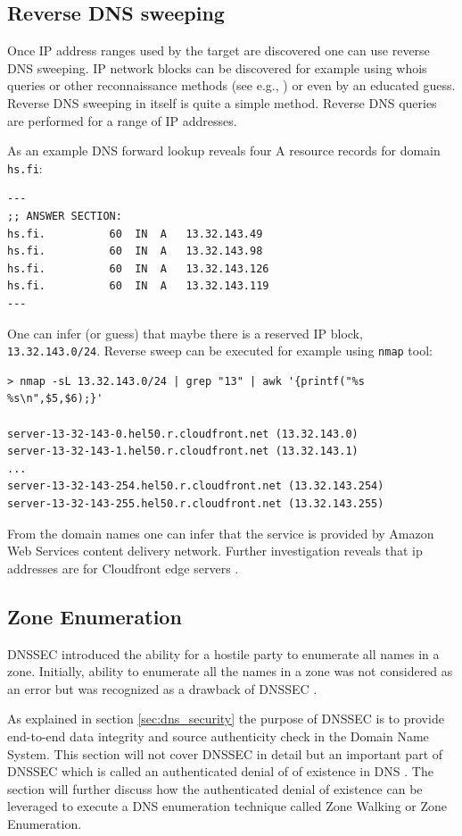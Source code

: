 \subsection{Reverse DNS sweeping}

Once IP address ranges used by the target are discovered one can use reverse DNS sweeping. IP network blocks can be discovered for example using whois queries or other reconnaissance methods (see e.g., \cite{network_sec_assessment}) or even by an educated guess. Reverse DNS sweeping in itself is quite a simple method. Reverse DNS queries are performed for a range of IP addresses. 

As an example DNS forward lookup reveals four A resource records for domain \texttt{hs.fi}:
\begin{verbatim}
---
;; ANSWER SECTION:
hs.fi.			60	IN	A	13.32.143.49
hs.fi.			60	IN	A	13.32.143.98
hs.fi.			60	IN	A	13.32.143.126
hs.fi.			60	IN	A	13.32.143.119
---
\end{verbatim}
One can infer (or guess) that maybe there is a reserved IP block, \texttt{13.32.143.0/24}. Reverse sweep can be executed for example using \texttt{nmap} tool:
\begin{verbatim}
> nmap -sL 13.32.143.0/24 | grep "13" | awk '{printf("%s %s\n",$5,$6);}'

server-13-32-143-0.hel50.r.cloudfront.net (13.32.143.0)
server-13-32-143-1.hel50.r.cloudfront.net (13.32.143.1)
...
server-13-32-143-254.hel50.r.cloudfront.net (13.32.143.254)
server-13-32-143-255.hel50.r.cloudfront.net (13.32.143.255)
\end{verbatim}

From the domain names one can infer that the service is provided by Amazon Web Services content delivery network. Further investigation reveals that ip addresses are for Cloudfront edge servers \cite{AWS}.

\subsection{Zone Enumeration}

DNSSEC introduced the ability for a hostile party to enumerate all names in a zone. Initially, ability to enumerate all the names in a zone was not considered as an error but was recognized as a drawback of DNSSEC \cite{RFC_4033}.

As explained in section \ref{sec:dns_security} the purpose of DNSSEC is to provide end-to-end data integrity and source authenticity check in the Domain Name System. This section will not cover DNSSEC in detail but an important part of DNSSEC which is called an authenticated denial of 
of existence in DNS  \cite{RFC_7129}. The section will further discuss how the authenticated denial of existence can be leveraged to execute a DNS enumeration technique called Zone Walking or Zone Enumeration.


